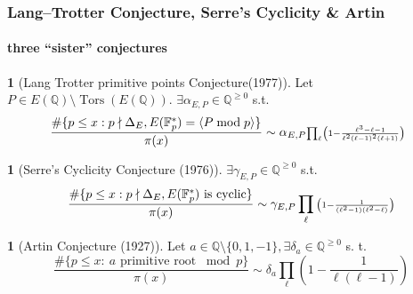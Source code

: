 \documentclass[10pt,handout]{beamer} %
\newcommand{\Q}{\mathbb Q}
\newcommand{\F}{\mathbb F}
\theoremstyle{definition}
\newtheorem{conj}[theorem]{\translate{Conjecture}}
\begin{document}
\begin{frame}
\frametitle{Lang--Trotter Conjecture, Serre's Cyclicity \& Artin}
\framesubtitle{three ``sister'' conjectures}\pause


\begin{conj}[\textcolor{red!70!black}{Lang Trotter primitive points Conjecture}(1977)]\pause Let $P\in E(\Q)\setminus \operatorname{Tors}(E(\Q))$.
$\exists \alpha_{E,P}\in\Q^{\ge0}$ s.t.
$$\!\!\!\frac{\#\{p\le x: p\nmid\Delta_E, E(\F_p^*)=\langle P\bmod p\rangle\}}{\pi(x)}\sim
\alpha_{{E,P}}
\scriptstyle{\prod_\ell\left(
1-\frac{\ell^3-\ell-1}{\ell^2(\ell-1)^2(\ell+1)}\right)}\vspace*{-11pt}$$
\end{conj}\pause

% 
% 

\begin{conj}[\textcolor{red!70!black}{Serre's Cyclicity Conjecture} (1976)]\pause
$\exists \gamma_{E,P}\in\Q^{\ge0}$ s.t.%
$$\frac{\#\{p\le x: p\nmid\Delta_E, E(\F_p^*)\text{ is cyclic}\}}{\pi(x)}\sim\gamma_{E,P}
\prod_\ell{\scriptstyle{\left(
1-\frac1{(\ell^2-1)(\ell^2-\ell)}\right)}}\vspace*{-11pt}$$
\end{conj}\pause

\begin{conj}[\textcolor{red!70!black}{Artin Conjecture} (1927)]\pause Let $a\in\Q\setminus\{0,1,-1\},
\exists \delta_a\in\Q^{\ge0}$ s. t.
$$\frac{\#\{p\le x:\ a\text{ primitive root }\bmod p\}}{\pi(x)}\sim\delta_a\prod_\ell\left(
1-\frac{1}{\ell(\ell-1)}\right)$$
\end{conj}

\end{frame}
\end{document}
